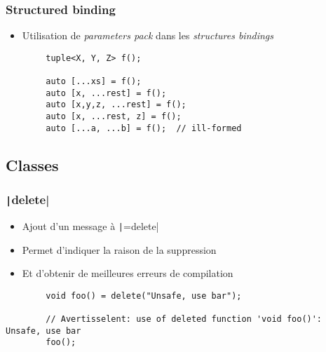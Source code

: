 \documentclass[C++.tex]{subfiles}
\begin{document}
\begin{frame}[fragile]
	\frametitle{Structured binding}
	\begin{itemize}
		\item Utilisation de \textit{parameters pack} dans les \textit{structures bindings}
	\end{itemize}

	\begin{verbatim}
		tuple<X, Y, Z> f();

		auto [...xs] = f();
		auto [x, ...rest] = f();
		auto [x,y,z, ...rest] = f();
		auto [x, ...rest, z] = f();
		auto [...a, ...b] = f();  // ill-formed
	\end{verbatim}

\end{frame}

\subsection*{Classes}
\begin{frame}[fragile]
	\frametitle{\texttt|delete|}
	\begin{itemize}
		\item Ajout d'un message à \texttt|=delete|
		\item Permet d'indiquer la raison de la suppression
		\item Et d'obtenir de meilleures erreurs de compilation
	\end{itemize}

	\begin{verbatim}
		void foo() = delete("Unsafe, use bar");

		// Avertisselent: use of deleted function 'void foo()': Unsafe, use bar
		foo();
	\end{verbatim}


\end{frame}
\end{document}
